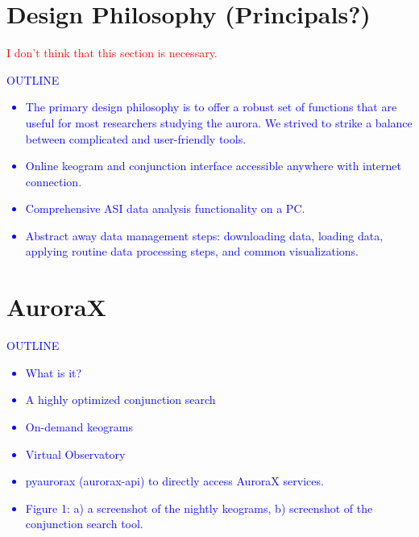 \documentclass[draft]{agujournal2019}
\begin{document}
\section{Design Philosophy (Principals?)}
\textcolor{red}{I don't think that this section is necessary.}
\textcolor{blue}{
      OUTLINE
      \begin{itemize}
            \item The primary design philosophy is to offer a robust set of functions that are useful for most researchers studying the aurora. We strived to strike a balance between complicated and user-friendly tools. 
            \item Online keogram and conjunction interface accessible anywhere with internet connection.
            \item Comprehensive ASI data analysis functionality on a PC.
            \item Abstract away data management steps: downloading data, loading data, applying routine data processing steps, and common visualizations.
      \end{itemize}
}

\section{AuroraX}\label{aurorax}
\textcolor{blue}{
      OUTLINE
      \begin{itemize}
            \item What is it?
            \item A highly optimized conjunction search
            \item On-demand keograms
            \item Virtual Observatory
            \item pyaurorax (aurorax-api) to directly access AuroraX services.
            \item Figure 1: a) a screenshot of the nightly keograms, b) screenshot of the conjunction search tool. 
      \end{itemize}
}
\end{document}
